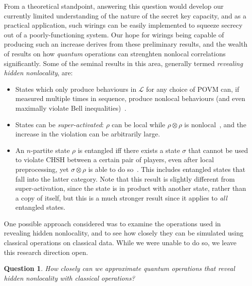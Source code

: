 \documentclass[10pt, a4paper]{article}
\numberwithin{equation}{section} %
\theoremstyle{definition}
\theoremstyle{plain}
\newtheorem{question}{Question}
\newcommand{\?}{\mathrel{?}} %
\newcommand{\Ls}{\mathcal{L}}
\begin{document}
              From a theoretical standpoint, answering this question would develop our currently limited understanding of the nature of the secret key capacity, and as a practical application, such wirings can be easily implemented to squeeze secrecy out of a poorly-functioning system. Our hope for wirings being capable of producing such an increase derives from these preliminary results, and the wealth of results on how \emph{quantum} operations can strenghten nonlocal correlations significantly. Some of the seminal results in this area, generally termed \emph{revealing hidden nonlocality}, are:
              \begin{itemize}
                \item States which only produce behaviours in \(\Ls\) for any choice of POVM can, if measured multiple times in sequence, produce nonlocal behaviours (and even maximally violate Bell inequalities)~\cite{HiddenNLAllMeas}.
                \item States can be \emph{super-activated}: \(\rho\) can be local while \(\rho \otimes \rho\) is nonlocal~\cite{SuperActivationBipartite}, and the increase in the violation can be arbitrarily large.
                \item An \(n\)-partite state \(\rho\) is entangled iff there exists a state \(\sigma\) that cannot be used to violate CHSH between a certain pair of players, even after local preprocessing, yet \(\sigma \otimes \rho\) is able to do so~\cite{AllEntangHidden}. This includes entangled states that fall into the latter category. Note that this result is slightly different from super-activation, since the state is in product with another state, rather than a copy of itself, but this is a much stronger result since it applies to \emph{all} entangled states.
              \end{itemize}

              One possible approach considered was to examine the operations used in revealing hidden nonlocality, and to see how closely they can be simulated using classical operations on classical data. While we were unable to do so, we leave this research direction open.
              \begin{question}
                How closely can we approximate quantum operations that reveal hidden nonlocality with classical operations?
              \end{question}
\end{document}
